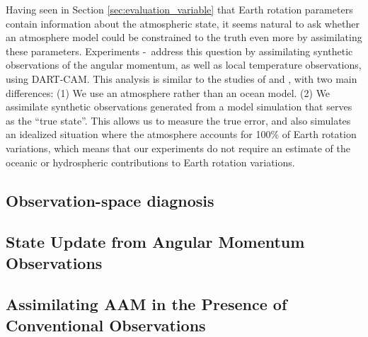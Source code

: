 Having seen in Section \ref{sec:evaluation_variable} that Earth rotation parameters contain information about the atmospheric state, it seems natural to ask whether an atmosphere model could be constrained to the truth even more by assimilating these parameters. 
Experiments \NODA-\ERPRST ~address this question by assimilating synthetic observations of the angular momentum, as well as local temperature observations, using DART-CAM.
This analysis is similar to the studies of \citet{Saynisch2010,Saynisch2011} and \citet{Saynisch2012}, with two main differences:
(1) We use an atmosphere rather than an ocean model.
(2) We assimilate synthetic observations generated from a model simulation that serves as the ``true state''. 
This allows us to measure the true error, and 
also simulates an idealized situation where the atmosphere accounts for 100\% of Earth rotation variations, which means that our experiments do not require an estimate of the oceanic or hydrospheric contributions to Earth rotation variations.

\subsection{Observation-space diagnosis}
\label{sec:obs_space}


\subsection{State Update from Angular Momentum Observations}
\label{sec:erpda}


\subsection{Assimilating AAM in the Presence of Conventional Observations}
\label{sec:added_value}


